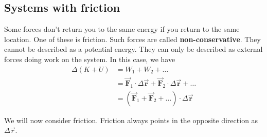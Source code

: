 \documentclass{handout}
\begin{document}
\subsection{Systems with friction}
Some forces don't return you to the same energy if you return to the same location. One of these is friction. Such forces are called \textbf{non-conservative}. They cannot be described as a potential energy. They can only be described as external forces doing work on the system. In this case, we have
\begin{align*}
    \Delta (K+U)&=W_1 +W_2+\dots \\&= \vec{\boldsymbol{F}}_1 \cdot \Delta \vec{\boldsymbol{r}}+\vec{\boldsymbol{F}}_2 \cdot \Delta \vec{\boldsymbol{r}} + \dots\\
    &= (\vec{\boldsymbol{F}}_1 + \vec{\boldsymbol{F}}_2 + \dots) \cdot \Delta \vec{\boldsymbol{r}}
\end{align*}

We will now consider friction. Friction always points in the opposite direction as $\Delta \vec{r}$.
\end{document}
